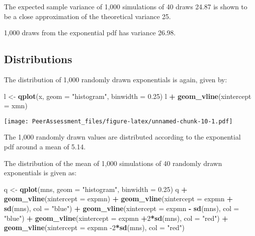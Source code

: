 \documentclass[]{article}
\newenvironment{Shaded}{\begin{snugshade}}{\end{snugshade}}
\newcommand{\DataTypeTok}[1]{\textcolor[rgb]{0.13,0.29,0.53}{#1}}
\newcommand{\DecValTok}[1]{\textcolor[rgb]{0.00,0.00,0.81}{#1}}
\newcommand{\FloatTok}[1]{\textcolor[rgb]{0.00,0.00,0.81}{#1}}
\newcommand{\KeywordTok}[1]{\textcolor[rgb]{0.13,0.29,0.53}{\textbf{#1}}}
\newcommand{\NormalTok}[1]{#1}
\newcommand{\OperatorTok}[1]{\textcolor[rgb]{0.81,0.36,0.00}{\textbf{#1}}}
\newcommand{\StringTok}[1]{\textcolor[rgb]{0.31,0.60,0.02}{#1}}
\begin{document}
The expected sample variance of 1,000 simulations of 40 draws 24.87 is
shown to be a close approximation of the theoretical variance 25.

1,000 draws from the exponential pdf has variance 26.98.

\hypertarget{distributions}{%
\subsection{Distributions}\label{distributions}}

The distribution of 1,000 randomly drawn exponentials is again, given
by:

\begin{Shaded}
\begin{Highlighting}[]
\NormalTok{l <-}\StringTok{ }\KeywordTok{qplot}\NormalTok{(x, }\DataTypeTok{geom =} \StringTok{"histogram"}\NormalTok{, }\DataTypeTok{binwidth =} \FloatTok{0.25}\NormalTok{)}
\NormalTok{l  }\OperatorTok{+}\StringTok{ }\KeywordTok{geom_vline}\NormalTok{(}\DataTypeTok{xintercept =}\NormalTok{ xmn)}
\end{Highlighting}
\end{Shaded}

\texttt{[image: PeerAssessment\_files/figure-latex/unnamed-chunk-10-1.pdf]}

The 1,000 randomly drawn values are distributed according to the
exponential pdf around a mean of 5.14.

The distribution of the mean of 1,000 simulations of 40 randomly drawn
exponentials is given as:

\begin{Shaded}
\begin{Highlighting}[]
\NormalTok{q <-}\StringTok{ }\KeywordTok{qplot}\NormalTok{(mns, }\DataTypeTok{geom =} \StringTok{"histogram"}\NormalTok{, }\DataTypeTok{binwidth =} \FloatTok{0.25}\NormalTok{) }
\NormalTok{q }\OperatorTok{+}\StringTok{ }\KeywordTok{geom_vline}\NormalTok{(}\DataTypeTok{xintercept =}\NormalTok{ expmn) }\OperatorTok{+}\StringTok{ }
\StringTok{  }\KeywordTok{geom_vline}\NormalTok{(}\DataTypeTok{xintercept =}\NormalTok{ expmn }\OperatorTok{+}\StringTok{ }\KeywordTok{sd}\NormalTok{(mns), }\DataTypeTok{col =} \StringTok{"blue"}\NormalTok{) }\OperatorTok{+}\StringTok{ }
\StringTok{  }\KeywordTok{geom_vline}\NormalTok{(}\DataTypeTok{xintercept =}\NormalTok{ expmn }\OperatorTok{-}\StringTok{ }\KeywordTok{sd}\NormalTok{(mns), }\DataTypeTok{col =} \StringTok{"blue"}\NormalTok{) }\OperatorTok{+}
\StringTok{  }\KeywordTok{geom_vline}\NormalTok{(}\DataTypeTok{xintercept =}\NormalTok{ expmn }\OperatorTok{+}\DecValTok{2}\OperatorTok{*}\KeywordTok{sd}\NormalTok{(mns), }\DataTypeTok{col =} \StringTok{"red"}\NormalTok{) }\OperatorTok{+}
\StringTok{  }\KeywordTok{geom_vline}\NormalTok{(}\DataTypeTok{xintercept =}\NormalTok{ expmn }\DecValTok{-2}\OperatorTok{*}\KeywordTok{sd}\NormalTok{(mns), }\DataTypeTok{col =} \StringTok{"red"}\NormalTok{)}
\end{Highlighting}
\end{Shaded}
\end{document}
